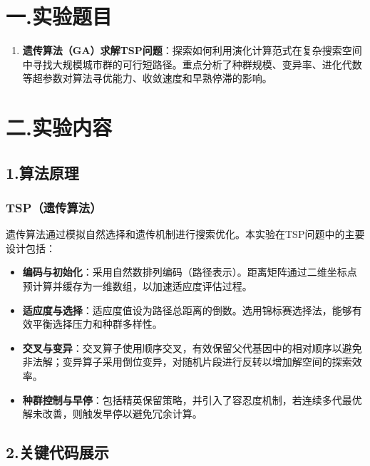 \documentclass{SYSUReport}
\date{\today}
\begin{document}
\cover
{}
\thispagestyle{empty} %
\clearpage

\setcounter{page}{1}

\section{一.实验题目}

\begin{enumerate}
    \item \textbf{遗传算法（GA）求解TSP问题}：探索如何利用演化计算范式在复杂搜索空间中寻找大规模城市群的可行短路径。重点分析了种群规模、变异率、进化代数等超参数对算法寻优能力、收敛速度和早熟停滞的影响。
\end{enumerate}

\section{二.实验内容}

\subsection{1.算法原理}

\subsubsection{TSP（遗传算法）}
遗传算法通过模拟自然选择和遗传机制进行搜索优化。本实验在TSP问题中的主要设计包括：
\begin{itemize}
    \item \textbf{编码与初始化}：采用自然数排列编码（路径表示）。距离矩阵通过二维坐标点预计算并缓存为一维数组，以加速适应度评估过程。
    \item \textbf{适应度与选择}：适应度值设为路径总距离的倒数。选用锦标赛选择法，能够有效平衡选择压力和种群多样性。
    \item \textbf{交叉与变异}：交叉算子使用顺序交叉，有效保留父代基因中的相对顺序以避免非法解；变异算子采用倒位变异，对随机片段进行反转以增加解空间的探索效率。
    \item \textbf{种群控制与早停}：包括精英保留策略，并引入了容忍度机制，若连续多代最优解未改善，则触发早停以避免冗余计算。
\end{itemize}


\subsection{2.关键代码展示}
\end{document}
